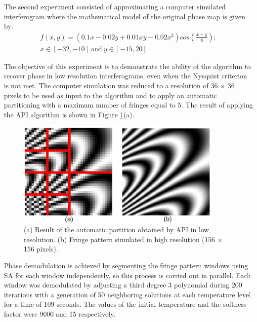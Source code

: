 \documentclass[review]{elsarticle}
\begin{document}
The second experiment consisted of approximating a computer simulated interferogram where the mathematical model of the original phase map is given by:
\begin{eqnarray}\label{eq9}
	f(x,y) = (0.1x - 0.02y + 0.01xy -0.02x^2)cos(\frac{x+y}{8});\\
	  x\in[-32, -10] \ \text{and} \ y\in[-15, 20].\nonumber
\end{eqnarray}

The objective of this experiment is to demonstrate the ability of the algorithm to recover phase in low resolution interferograms, even when the Nysquist criterion is not met. The computer simulation was reduced to a resolution of 36 $\times$ 36 pixels to be used as input to the algorithm and to apply an automatic partitioning with a maximum number of fringes equal to 5.  The result of applying the API algorithm is shown in Figure \ref{Fig6}(a).
\begin{figure}[ht!]
\centering\includegraphics[width=10cm]{fig6}
\caption{(a) Result of the automatic partition obtained by API in low resolution. (b) Fringe pattern simulated in high resolution (156 $\times$ 156 pixels).}
\label{Fig6}
\end{figure}

Phase demodulation is achieved by segmenting the  fringe pattern windows using SA for each window independently, so this process is carried out in parallel. Each window was demodulated by adjusting a third degree 3 polynomial during 200 iterations with a generation of 50 neighboring solutions at each temperature level for a time of 109 seconds. The values of the initial temperature and the softness factor were 9000 and 15 respectively.
\end{document}
